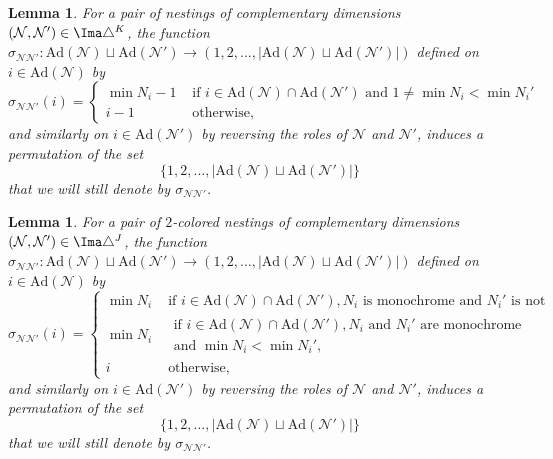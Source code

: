 \documentclass[JEP,XML,SOM,NoFloatCountersInSection,Unicode,published]{cedram}
\theoremstyle{definition}
\theoremstyle{plain}
\newtheorem{lemma}[definition]{Lemma}
\begin{document}
\begin{lemma}
\label{prop:signs-ass}
For a pair of nestings of complementary dimensions $(\mathcal{N}, \mathcal{N}')\in \Ima\triangle^K$, the function $\sigma_{\mathcal{N}\mathcal{N}'}: \mathrm{Ad}(\mathcal{N})\sqcup \mathrm{Ad}(\mathcal{N}') \to (1,2,\ldots,|\mathrm{Ad}(\mathcal{N})\sqcup \mathrm{Ad}(\mathcal{N}')|)$ defined on $i \in \mathrm{Ad}(\mathcal{N})$ by
\begin{equation*}
\sigma_{\mathcal{N}\mathcal{N}'}(i)=
\begin{cases}
\min N_i -1 & \text{ if } i \in \mathrm{Ad}(\mathcal{N})\cap \mathrm{Ad}(\mathcal{N}') \text{ and } 1 \neq \min N_i < \min N_i' \\
i-1 & \text{ otherwise,}
\end{cases}
\end{equation*}
and similarly on $i \in \mathrm{Ad}(\mathcal{N}')$ by reversing the roles of $\mathcal{N}$ and $\mathcal{N}'$, induces a permutation of the set
\[
\{1,2,\ldots,|\mathrm{Ad}(\mathcal{N})\sqcup \mathrm{Ad}(\mathcal{N}')|\}
\]
that we will still denote by $\sigma_{\mathcal{N}\mathcal{N}'}$.
\end{lemma}

\begin{lemma}
\label{prop:signs-mul}
For a pair of $2$-colored nestings of complementary dimensions $(\mathcal{N},\mathcal{N}')\in \Ima\triangle^J$, the function $\sigma_{\mathcal{N}\mathcal{N}'}: \mathrm{Ad}(\mathcal{N})\sqcup \mathrm{Ad}(\mathcal{N}') \to (1,2,\ldots,|\mathrm{Ad}(\mathcal{N})\sqcup \mathrm{Ad}(\mathcal{N}')|)$ defined on $i \in \mathrm{Ad}(\mathcal{N})$ by
\begin{equation*}
\sigma_{\mathcal{N}\mathcal{N}'}(i)=
\begin{cases}
\min N_i & \text{ if } i \in \mathrm{Ad}(\mathcal{N})\cap \mathrm{Ad}(\mathcal{N}'), N_i \text{ is monochrome and } N_i' \text{ is not} \\
\min N_i & \begin{array}{l}
\text{ if } i \in \mathrm{Ad}(\mathcal{N})\cap \mathrm{Ad}(\mathcal{N}'), N_i \text{ and } N_i' \text{ are monochrome} \\
\text{ and } \min N_i < \min N_i',
\end{array} \\
i & \text{ otherwise,}
\end{cases}
\end{equation*}
and similarly on $i \in \mathrm{Ad}(\mathcal{N}')$ by reversing the roles of $\mathcal{N}$ and $\mathcal{N}'$, induces a permutation of the set
\[
\{1,2,\ldots,|\mathrm{Ad}(\mathcal{N})\sqcup \mathrm{Ad}(\mathcal{N}')|\}
\]
that we will still denote by $\sigma_{\mathcal{N}\mathcal{N}'}$.
\end{lemma}
\end{document}
